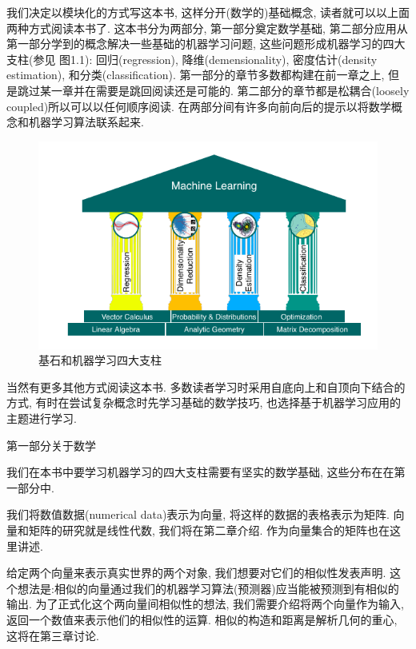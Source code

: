 我们决定以模块化的方式写这本书, 这样分开(数学的)基础概念, 读者就可以以上面两种方式阅读本书了.
这本书分为两部分, 第一部分奠定数学基础, 第二部分应用从第一部分学到的概念解决一些基础的机器学习问题,
这些问题形成机器学习的四大支柱(参见 图1.1): 
回归(regression), 降维(demensionality), 密度估计(density estimation), 和分类(classification).
第一部分的章节多数都构建在前一章之上, 但是跳过某一章并在需要是跳回阅读还是可能的.
第二部分的章节都是松耦合(loosely coupled)所以可以以任何顺序阅读.
在两部分间有许多向前向后的提示以将数学概念和机器学习算法联系起来.

\begin{figure}[H]
	\includegraphics[width=\textwidth]{./chapter01/pillar.png}
	\caption{基石和机器学习四大支柱}
\end{figure}


当然有更多其他方式阅读这本书.
多数读者学习时采用自底向上和自顶向下结合的方式, 
有时在尝试复杂概念时先学习基础的数学技巧, 
也选择基于机器学习应用的主题进行学习.

\begin{center}
	第一部分关于数学
\end{center}
我们在本书中要学习机器学习的四大支柱需要有坚实的数学基础, 这些分布在在第一部分中.

我们将数值数据(numerical data)表示为向量, 将这样的数据的表格表示为矩阵.
向量和矩阵的研究就是线性代数, 我们将在第二章介绍.
作为向量集合的矩阵也在这里讲述.

给定两个向量来表示真实世界的两个对象, 我们想要对它们的相似性发表声明.
这个想法是:相似的向量通过我们的机器学习算法(预测器)应当能被预测到有相似的输出.
为了正式化这个两向量间相似性的想法, 我们需要介绍将两个向量作为输入, 返回一个数值来表示他们的相似性的运算.
相似的构造和距离是解析几何的重心, 这将在第三章讨论.


